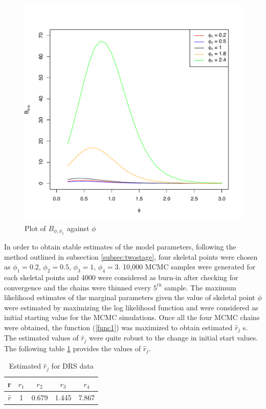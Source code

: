 \documentclass[11pt]{article}
\theoremstyle{remboldstyle}
\begin{document}
\begin{figure}[h]
\begin{center}
\includegraphics[scale=0.4]{plot1.pdf}
\end{center}
\caption{Plot of $B_{\phi, \phi_1}$ against $\phi$}
\end{figure}
\noindent
In order to obtain stable estimates of the model parameters, following the method outlined in subsection \ref{subsec:twostage}, four skeletal points were chosen as $\phi_1= 0.2$, $\phi_2= 0.5$, $\phi_3= 1$, $\phi_4 = 3$. 10,000 MCMC samples were generated for each skeletal points and 4000 were considered as burn-in after checking for convergence and the chains were thinned every $5^{th}$ sample. The maximum likelihood estimates of the marginal parameters given the value of skeletal point $\phi$ were estimated by maximizing the log likelihood function and were considered as initial starting value for the MCMC simulations. Once all the four MCMC chains were obtained, the function (\ref{func1}) was maximized to obtain estimated $\hat{r}_j$ s. The estimated values of $\hat{r}_j$  were quite robust to the change in initial start values. The following table \ref{tab4} provides the values of $\hat{r}_j$. 
\begin{table}[h]
\caption{Estimated $\hat{r}_j$ for DRS data}
\centering
\begin{tabular}{c c c c c}
\hline
r    & $r_1$  & $r_2$  & $r_3$  & $r_4$ \\
\hline
$\hat{r}$ & 1&  0.679 &  1.445  & 7.867 \\
 \hline             
\end{tabular}
\label{tab4}
\end{table}
\end{document}
